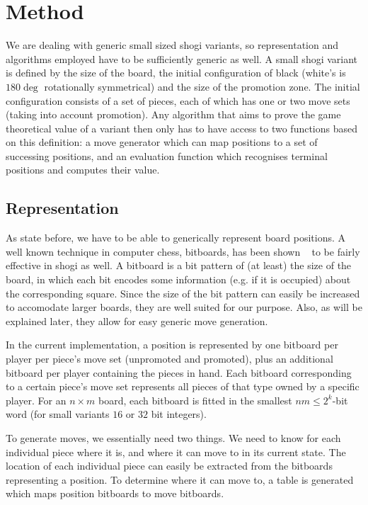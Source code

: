 \documentclass{article}
\begin{document}

\section{Method}
We are dealing with generic small sized shogi variants, so representation and algorithms employed have to be sufficiently generic as well.
A small shogi variant is defined by the size of the board, the initial configuration of black (white's is $180\deg$ rotationally symmetrical) and
the size of the promotion zone. The initial configuration consists of a set of pieces, each of which has one or two move sets (taking into account
promotion). Any algorithm that aims to prove the game theoretical value of a variant then only has to have access to two functions based on this
definition: a move generator which can map positions to a set of successing positions, and an evaluation function which recognises terminal
positions and computes their value.

\subsection{Representation}
As state before, we have to be able to generically represent board positions. A well known technique in computer chess, bitboards, has been
shown ~\cite{grimbergen2007using} to be fairly effective in shogi as well. A bitboard is a bit pattern of (at least) the size of the board,
in which each bit encodes some information (e.g. if it is occupied) about the corresponding square. Since the size of the bit pattern can
easily be increased to accomodate larger boards, they are well suited for our purpose. Also, as will be explained later, they allow for easy
generic move generation.

In the current implementation, a position is represented by one bitboard per player per piece's move set (unpromoted and promoted), plus an additional
bitboard per player containing the pieces in hand. Each bitboard corresponding to a certain piece's move set represents all pieces of that type
owned by a specific player. For an $n \times m$ board, each bitboard is fitted in the smallest $nm \leq 2^k$-bit word (for small
variants $16$ or $32$ bit integers). %

To generate moves, we essentially need two things. We need to know for each individual piece where it is, and where it can move to in its current state.
The location of each individual piece can easily be extracted from the bitboards representing a position. To determine where it can move to, a table
is generated which maps position bitboards to move bitboards. %
\end{document}
